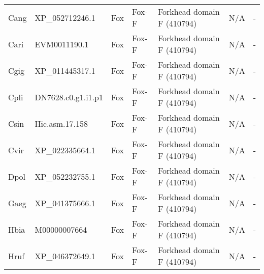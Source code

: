 \documentclass[../main.tex]{subfiles}
\begin{document}
\begin{landscape}
\begin{longtable}{lllllll}
		Cang           & XP\_052712246.1       & Fox            & Fox-F               & Forkhead domain F (410794)                  & N/A                                                                    & -                    \\
		Cari           & EVM0011190.1          & Fox            & Fox-F               & Forkhead domain F (410794)                  & N/A                                                                    & -                    \\
		Cgig           & XP\_011445317.1       & Fox            & Fox-F               & Forkhead domain F (410794)                  & N/A                                                                    & -                    \\
		Cpli           & DN7628.c0.g1.i1.p1    & Fox            & Fox-F               & Forkhead domain F (410794)                  & N/A                                                                    & -                    \\
		Csin           & Hic.asm.17.158        & Fox            & Fox-F               & Forkhead domain F (410794)                  & N/A                                                                    & -                    \\
		Cvir           & XP\_022335664.1       & Fox            & Fox-F               & Forkhead domain F (410794)                  & N/A                                                                    & -                    \\
		Dpol           & XP\_052232755.1       & Fox            & Fox-F               & Forkhead domain F (410794)                  & N/A                                                                    & -                    \\
		Gaeg           & XP\_041375666.1       & Fox            & Fox-F               & Forkhead domain F (410794)                  & N/A                                                                    & -                    \\
		Hbia           & M00000007664          & Fox            & Fox-F               & Forkhead domain F (410794)                  & N/A                                                                    & -                    \\
		Hruf           & XP\_046372649.1       & Fox            & Fox-F               & Forkhead domain F (410794)                  & N/A                                                                    & -                    \\

\end{longtable}
\end{landscape}
\end{document}
